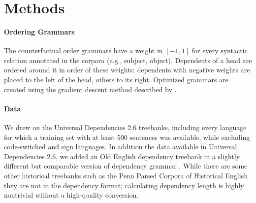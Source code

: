 \documentclass[11pt,a4paper]{article}
\begin{document}
\section*{Methods}





\paragraph{Ordering Grammars}

The counterfactual order grammars have a weight in $[-1, 1]$ for every syntactic relation annotated in the corpora (e.g., subject, object).
Dependents of a head are ordered around it in order of these weights; dependents with negative weights are placed to the left of the head, others to its right.
Optimized grammars are created using the gradient descent method described by \citep{hahn2020universals}.








\paragraph{Data}
We drew on the Universal Dependencies 2.6 treebanks, including every language for which a training set with at least 500 sentences was available, while excluding code-switched and sign languages.
In addition the data available in Universal Dependencies 2.6, we added an Old English dependency treebank in a slightly different but comparable version of dependency grammar \citep{bech2014iswoc}.
While there are some other historical treebanks such as the Penn Parsed Corpora of Historical English \citep{kroch2011penn} they are not in the dependency format; calculating dependency length is highly nontrivial without a high-quality conversion.
\end{document}
